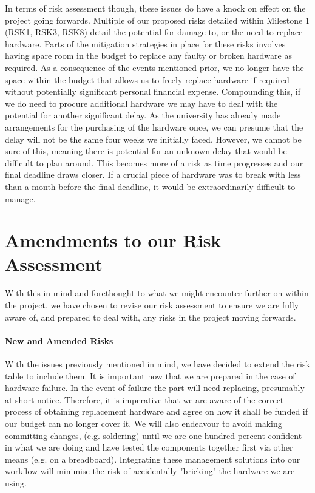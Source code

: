 In terms of risk assessment though, these issues do have a knock on effect on the project going forwards. Multiple of our proposed risks detailed within Milestone 1\cite{coaker} (RSK1, RSK3, RSK8) detail the potential for damage to, or the need to replace hardware. Parts of the mitigation strategies in place for these risks involves having spare room in the budget to replace any faulty or broken hardware as required. As a consequence of the events mentioned prior, we no longer have the space within the budget that allows us to freely replace hardware if required without potentially significant personal financial expense. Compounding this, if we do need to procure additional hardware we may have to deal with the potential for another significant delay. As the university has already made arrangements for the purchasing of the hardware once, we can presume that the delay will not be the same four weeks we initially faced. However, we cannot be sure of this, meaning there is potential for an unknown delay that would be difficult to plan around. This becomes more of a risk as time progresses and our final deadline draws closer. If a crucial piece of hardware was to break with less than a month before the final deadline, it would be extraordinarily difficult to manage.

\section{Amendments to our Risk Assessment}

With this in mind and forethought to what we might encounter further on within the project, we have chosen to revise our risk assessment to ensure we are fully aware of, and prepared to deal with, any risks in the project moving forwards. 

\paragraph{New and Amended Risks}

With the issues previously mentioned in mind, we have decided to extend the risk table to include them. It is important now that we are prepared in the case of hardware failure. In the event of failure the part will need replacing, presumably at short notice. Therefore, it is imperative that we are aware of the correct process of obtaining replacement hardware and agree on how it shall be funded if our budget can no longer cover it. We will also endeavour to avoid making committing changes, (e.g. soldering) until we are one hundred percent confident in what we are doing and have tested the components together first via other means (e.g. on a breadboard). Integrating these management solutions into our workflow will minimise the risk of accidentally "bricking" the hardware we are using.

